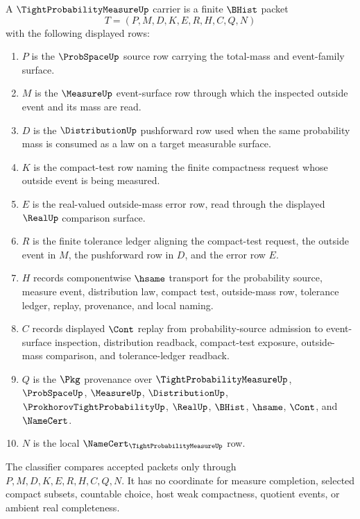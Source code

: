\begin{definition}
\label{def:tight-probability-measure-carrier}
A $\TightProbabilityMeasureUp$ carrier is a finite $\BHist$ packet
$$
T=(P,M,D,K,E,R,H,C,Q,N)
$$
with the following displayed rows:
\begin{enumerate}
\item $P$ is the $\ProbSpaceUp$ source row carrying the total-mass and event-family surface.
\item $M$ is the $\MeasureUp$ event-surface row through which the inspected outside event and its mass are read.
\item $D$ is the $\DistributionUp$ pushforward row used when the same probability mass is consumed as a law on a target measurable surface.
\item $K$ is the compact-test row naming the finite compactness request whose outside event is being measured.
\item $E$ is the real-valued outside-mass error row, read through the displayed $\RealUp$ comparison surface.
\item $R$ is the finite tolerance ledger aligning the compact-test request, the outside event in $M$, the pushforward row in $D$, and the error row $E$.
\item $H$ records componentwise $\hsame$ transport for the probability source, measure event, distribution law, compact test, outside-mass row, tolerance ledger, replay, provenance, and local naming.
\item $C$ records displayed $\Cont$ replay from probability-source admission to event-surface inspection, distribution readback, compact-test exposure, outside-mass comparison, and tolerance-ledger readback.
\item $Q$ is the $\Pkg$ provenance over $\TightProbabilityMeasureUp$, $\ProbSpaceUp$, $\MeasureUp$, $\DistributionUp$, $\ProkhorovTightProbabilityUp$, $\RealUp$, $\BHist$, $\hsame$, $\Cont$, and $\NameCert$.
\item $N$ is the local $\NameCert_{\TightProbabilityMeasureUp}$ row.
\end{enumerate}
The classifier compares accepted packets only through $P,M,D,K,E,R,H,C,Q,N$. It has no coordinate for measure completion, selected compact subsets, countable choice, host weak compactness, quotient events, or ambient real completeness.
\end{definition}

